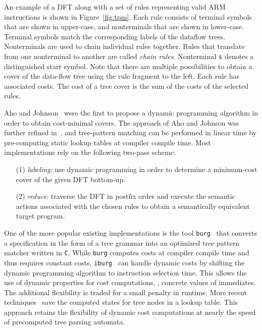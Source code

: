 An example of a DFT along with a set of rules representing valid ARM
instructions is shown in Figure~\ref{fig:tpm}. Each rule consists of
terminal symbols that are shown in upper-case, and nonterminals that
are shown in lower-case. Terminal symbols match the corresponding
labels of the dataflow trees. Nonterminals are used to chain
individual rules together. Rules that translate from one nonterminal
to another are called \emph{chain rules}. Nonterminal \texttt{s}
denotes a distinguished start symbol. Note that there are multiple
possibilities to obtain a cover of the data-flow tree using the rule
fragment to the left. Each rule has associated costs. The cost of a
tree cover is the sum of the costs of the selected rules.

Aho and Johnson~\cite{aj:76} were the first to propose a dynamic
programming algorithm in order to obtain cost-minimal covers. The
approach of Aho and Johnson was further refined
in~\cite{Balachandran90TreeMatching}, and tree-pattern matching can be
performed in linear time by pre-computing static lookup tables at
compiler compile time. Most implementations rely on the following
two-pass scheme:
\begin{enumerate}
\item[(1)]\emph{labeling:} use dynamic programming in order to
  determine a minimum-cost cover of the given DFT bottom-up.
\item[(2)]\emph{reduce}: traverse the DFT in postfix order and execute
  the semantic actions associated with the chosen rules to obtain a
  semantically equivalent target program.
\end{enumerate}
One of the more popular existing implementations is the tool
\texttt{burg}~\cite{FHP:92} that converts a specification
in the form of a tree grammar into an optimized tree pattern matcher
written in \texttt{C}. While \texttt{burg} computes costs at compiler
compile time and thus requires constant costs,
\texttt{iburg}~\cite{Fraser92Iburg} can handle dynamic costs by
shifting the dynamic programming algorithm to instruction selection
time. This allows the use of dynamic properties for cost computations,
\eg, concrete values of immediates. The additional flexibility is
traded for a small penalty in runtime.  More recent
techniques~\cite{ecg:06} save the computed states for tree nodes in a
lookup table. This approach retains the flexibility of dynamic cost
computations at nearly the speed of precomputed tree parsing automata.

